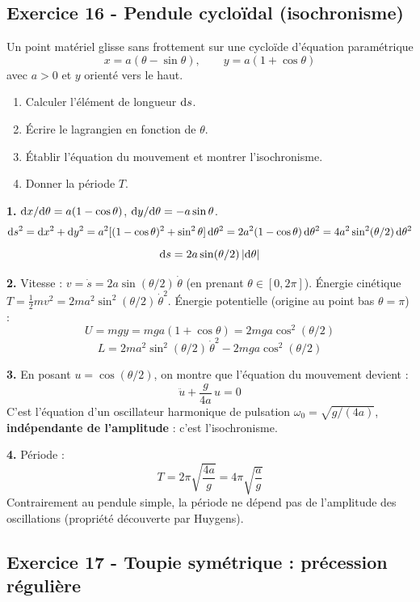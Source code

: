 \documentclass[12pt,a4paper]{article}
\begin{document}
\subsection*{Exercice 16 - Pendule cycloïdal (isochronisme) \niveau{\difficile}}

\begin{boiteexercice}
Un point matériel glisse sans frottement sur une cycloïde d'équation paramétrique
\[
x = a(\theta - \sin\theta), \qquad y = a(1 + \cos\theta)
\]
avec $a > 0$ et $y$ orienté vers le haut.
\begin{enumerate}
  \item Calculer l'élément de longueur $\mathrm{d} s$.
  \item Écrire le lagrangien en fonction de $\theta$.
  \item Établir l'équation du mouvement et montrer l'isochronisme.
  \item Donner la période $T$.
\end{enumerate}
\end{boiteexercice}

\begin{boitecorrige}
\textbf{1.} $\mathrm{d} x/\mathrm{d}\theta = a(1 - \cos\theta)$, $\mathrm{d} y/\mathrm{d}\theta = -a\sin\theta$.
\[
\mathrm{d} s^2 = \mathrm{d} x^2 + \mathrm{d} y^2 = a^2[(1-\cos\theta)^2 + \sin^2\theta]\,\mathrm{d}\theta^2 = 2a^2(1-\cos\theta)\,\mathrm{d}\theta^2 = 4a^2\sin^2(\theta/2)\,\mathrm{d}\theta^2
\]
\[
\mathrm{d} s = 2a\sin(\theta/2)\,|\mathrm{d}\theta|
\]

\textbf{2.} Vitesse : $v = \dot s = 2a\sin(\theta/2)\,\dot\theta$ (en prenant $\theta \in [0, 2\pi]$). Énergie cinétique $T = \tfrac{1}{2}m v^2 = 2ma^2\sin^2(\theta/2)\,\dot\theta^2$. Énergie potentielle (origine au point bas $\theta = \pi$) :
\[
U = mgy = mga(1 + \cos\theta) = 2mga\cos^2(\theta/2)
\]
\[
L = 2ma^2\sin^2(\theta/2)\,\dot\theta^2 - 2mga\cos^2(\theta/2)
\]

\textbf{3.} En posant $u = \cos(\theta/2)$, on montre que l'équation du mouvement devient :
\[
\ddot u + \frac{g}{4a}\,u = 0
\]
C'est l'équation d'un oscillateur harmonique de pulsation $\omega_0 = \sqrt{g/(4a)}$, \textbf{indépendante de l'amplitude} : c'est l'isochronisme.

\textbf{4.} Période :
\[
T = 2\pi\sqrt{\frac{4a}{g}} = 4\pi\sqrt{\frac{a}{g}}
\]
Contrairement au pendule simple, la période ne dépend pas de l'amplitude des oscillations (propriété découverte par Huygens).
\end{boitecorrige}

\subsection*{Exercice 17 - Toupie symétrique : précession régulière \niveau{\difficile}}
\end{document}
